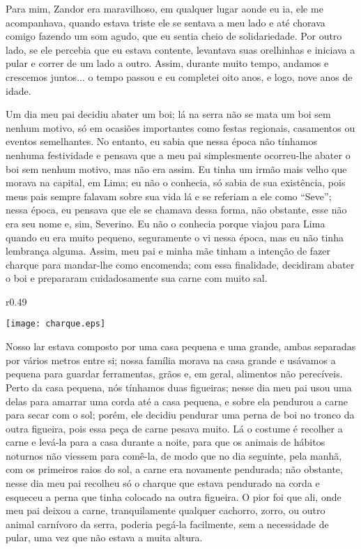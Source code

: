 Para mim, Zandor era maravilhoso, em qualquer lugar aonde eu ia, ele me acompanhava, quando estava triste ele se sentava a meu lado e até chorava comigo fazendo um som agudo, que eu sentia cheio de solidariedade. 
Por outro lado, se ele percebia que eu estava contente, levantava suas orelhinhas e iniciava a pular e correr de um lado a outro. Assim, durante muito tempo, andamos e crescemos juntos... o tempo passou e eu completei oito anos, e logo, nove anos de idade.

Um dia meu pai decidiu abater um boi; lá na serra não se mata um boi sem nenhum motivo, só em ocasiões importantes como festas regionais, casamentos ou eventos semelhantes. No entanto, eu sabia que nessa época não tínhamos nenhuma festividade e pensava que a meu pai simplesmente ocorreu-lhe abater o boi sem nenhum motivo, mas não era assim. 
Eu tinha um irmão mais velho que morava na capital, em Lima; eu não o conhecia, só sabia de sua existência, pois meus pais sempre falavam sobre sua vida lá e se referiam a ele como ``Seve''; nessa época, eu pensava que ele se chamava dessa forma, não obstante, esse não era seu nome e, sim, Severino. Eu não o conhecia porque viajou para Lima quando eu era muito pequeno, seguramente o vi nessa época, mas eu não tinha lembrança alguma. 
Assim, meu pai e minha mãe tinham a intenção de fazer charque para mandar-lhe como encomenda; com essa finalidade, decidiram abater o boi e prepararam cuidadosamente sua carne com muito sal.

\ifdefined\EnableIncludeImages
\begin{wrapfigure}{r}{0.49\textwidth}
  \begin{center}
  \vspace{-20pt}
    \texttt{[image: charque.eps]}
  \end{center}
  \vspace{-20pt}
\end{wrapfigure}
\fi
Nosso lar estava composto por uma casa pequena e uma grande, ambas separadas por vários metros entre si; nossa família morava na casa grande e usávamos a pequena para guardar ferramentas, grãos e, em geral, alimentos não perecíveis. 
Perto da casa pequena, nós tínhamos duas figueiras; nesse dia meu pai usou uma delas para amarrar uma corda até a casa pequena, e sobre ela pendurou a carne para secar com o sol; porém, ele decidiu pendurar uma perna de boi no tronco da outra figueira, pois essa peça de carne pesava muito.
Lá o costume é recolher a carne e levá-la para a casa durante a noite, para que os animais de hábitos noturnos não viessem para comê-la, de modo que no dia seguinte, pela manhã, com os primeiros raios do sol, a carne era novamente pendurada; não obstante, nesse dia meu pai recolheu só o charque que estava pendurado na corda e esqueceu a perna que tinha colocado na outra figueira. 
O pior foi que ali, onde meu pai deixou a carne, tranquilamente qualquer cachorro, zorro, ou outro animal carnívoro da serra, poderia pegá-la facilmente, sem a necessidade de pular, uma vez que não estava a muita altura.

